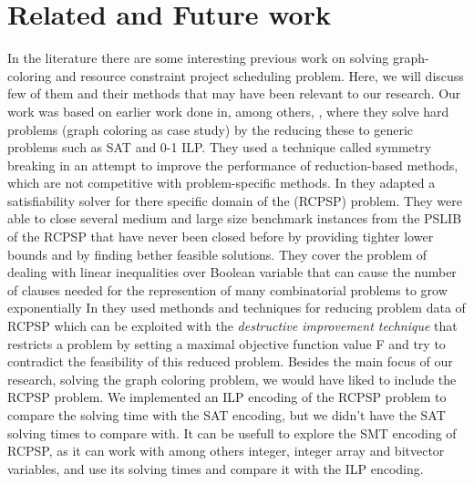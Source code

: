 \documentclass{sig-alternate}
\begin{document}
\section{Related and Future work}
\label{sec:relatedandfuture}
In the literature there are some interesting previous work on solving graph-coloring and resource constraint project scheduling problem. Here, we will discuss few of them and their methods that may have been relevant to our research.
Our work was based on earlier work done in, among others, \cite{ramani2004breaking}, where they solve hard problems (graph coloring as case study) by the reducing these to generic problems such as SAT and 0-1 ILP. They used a technique called symmetry breaking in an attempt to improve the performance of reduction-based methods, which are not competitive with problem-specific methods.
In \cite{horbach2010boolean} they adapted a satisfiability solver for there specific domain of the (RCPSP) problem. They were able to close several medium and large size benchmark instances from the PSLIB of the RCPSP that have never been closed before by providing tighter lower bounds and by finding bether feasible solutions. They cover the problem of dealing with linear inequalities over Boolean variable that can cause the number of clauses needed for the represention of many combinatorial problems to grow exponentially
In \cite{klein1999computing} they used methonds and techniques for reducing problem data of RCPSP which can be exploited with the \emph{destructive improvement technique} that restricts a problem by setting a maximal objective function value F and try to contradict the feasibility of this reduced problem. 
Besides the main focus of our research, solving the graph coloring problem, we would have liked to include
the RCPSP problem.
We implemented an ILP encoding of the RCPSP problem to compare the solving time with the SAT encoding, 
but we didn't have the SAT solving times to compare with. 
It can be usefull to explore the SMT encoding of RCPSP, as it can work with among others integer, 
integer array and bitvector variables, and use its solving times and compare it with the ILP encoding.

\cite{alves2013resource}
\cite{abio2014encoding}
\cite{wu2013exploiting}
\cite{velev2009exploiting}
\cite{horbach2010boolean}
\cite{klein1999computing}
\cite{mingozzi1998exact}
\cite{sharma2011polynomial}
\cite{ramani2004breaking}
\cite{schutt2011explaining}
\cite{wille2008using}
\cite{malaguti2010survey}
\cite{cs395tGCtoSAT}
\end{document}
